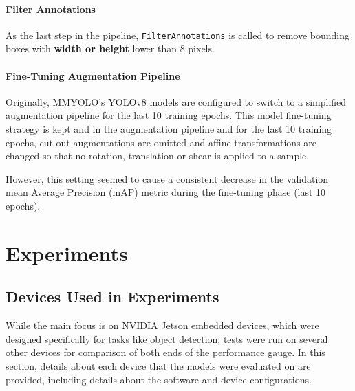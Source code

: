 \subsubsection*{Filter Annotations}

As the last step in the pipeline, \texttt{FilterAnnotations} is called to remove
bounding boxes with \textbf{width or height} lower than \num{8} pixels.


\subsubsection{Fine-Tuning Augmentation Pipeline}

Originally, MMYOLO's YOLOv8 models are configured to switch to a simplified
augmentation pipeline for the last 10 training epochs. This model fine-tuning
strategy is kept and in the augmentation pipeline and for the last 10 training
epochs, cut-out augmentations are omitted and affine transformations are changed
so that no rotation, translation or shear is applied to a sample.

However, this setting seemed to cause a consistent decrease in the validation
mean Average Precision (mAP) metric during the fine-tuning phase (last 10
epochs).







\chapter{Experiments}
\label{Experiments}


\section{Devices Used in Experiments}


While the main focus is on NVIDIA Jetson embedded devices, which were designed
specifically for tasks like object detection, tests were run on several other
devices for comparison of both ends of the performance gauge. In this section,
details about each device that the models were evaluated on are provided,
including details about the software and device configurations.




